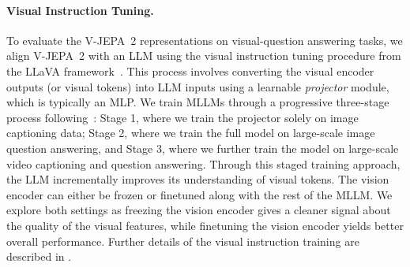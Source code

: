 \documentclass[]{fairmeta}
\newcommand{\model}{V-JEPA~2\xspace}
\begin{document}
\paragraph{\bf Visual Instruction Tuning.}
To evaluate the \model representations on visual-question answering tasks, we align \model with an LLM using the visual instruction tuning procedure from the LLaVA framework~\citep{liu2024improved}. 
This process involves converting the visual encoder outputs (or visual tokens) into LLM inputs using a learnable \textit{projector} module, which is typically an MLP. 
We train MLLMs through a progressive three-stage process following~\citet{liu2024llavanext}: Stage 1, where we train the projector solely on image captioning data; Stage 2, where we train the full model on large-scale image question answering, and Stage 3, where we further train the model on large-scale video captioning and question answering. Through this staged training approach, the LLM incrementally improves its understanding of visual tokens.
The vision encoder can either be frozen or finetuned along with the rest of the MLLM. We explore both settings as freezing the vision encoder gives a cleaner signal about the quality of the visual features, while finetuning the vision encoder yields better overall performance.
Further details of the visual instruction training are described in .
\end{document}

